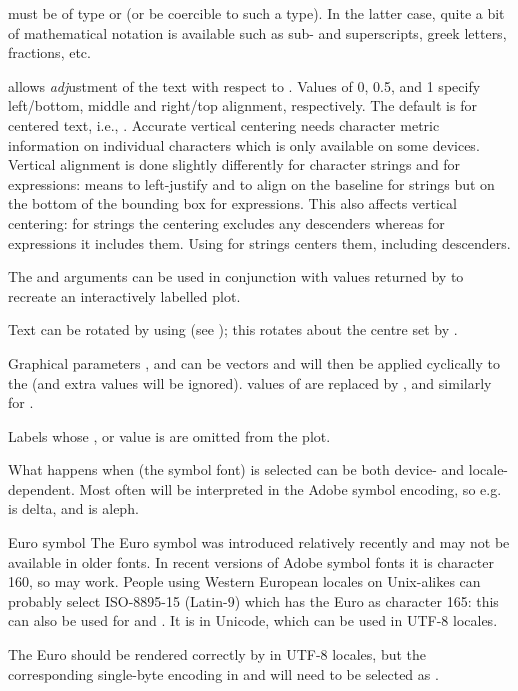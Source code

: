 %
\begin{Details}\relax
{} must be of type  or
 (or be coercible to such a type).
In the latter case, quite a bit of
mathematical notation is available such as sub- and superscripts,
greek letters, fractions, etc.

 allows \emph{adj}ustment of the text with respect to .
Values of 0, 0.5, and 1 specify left/bottom, middle and
right/top alignment, respectively.  The default is for centered text, i.e.,
.  Accurate vertical centering needs
character metric information on individual characters which is
only available on some devices.  Vertical alignment is done slightly
differently for character strings and for expressions:
 means to left-justify and to align on the baseline
for strings but on the bottom of the bounding box for expressions.
This also affects vertical centering: for strings the centering
excludes any descenders whereas for expressions it includes them.
Using  for strings centers them, including descenders.

The  and  arguments can be used in conjunction
with values returned by  to recreate an interactively
labelled plot.

Text can be rotated by using  
(see ); this rotates about the centre set by
.

Graphical parameters ,  and  can be
vectors and will then be applied cyclically to the  (and
extra values will be ignored).   values of  are
replaced by , and similarly for .

Labels whose ,  or  value is 
are omitted from the plot.

What happens when  (the symbol font) is selected can be
both device- and locale-dependent.  Most often  will be
interpreted in the Adobe symbol encoding, so e.g.  is delta,
and  is aleph.
\end{Details}
%
\begin{Section}{Euro symbol}
The Euro symbol was introduced relatively recently and may not be
available in older fonts.  In recent versions of Adobe symbol fonts it
is character 160, so  may work.
People using Western European locales on Unix-alikes can probably
select ISO-8895-15 (Latin-9) which has the Euro as character 165: this
can also be used for  and .
It is  in Unicode, which can be used in UTF-8 locales.

The Euro should be rendered correctly by  in UTF-8
locales, but the corresponding single-byte encoding in
 and  will need to be selected
as .
\end{Section}
